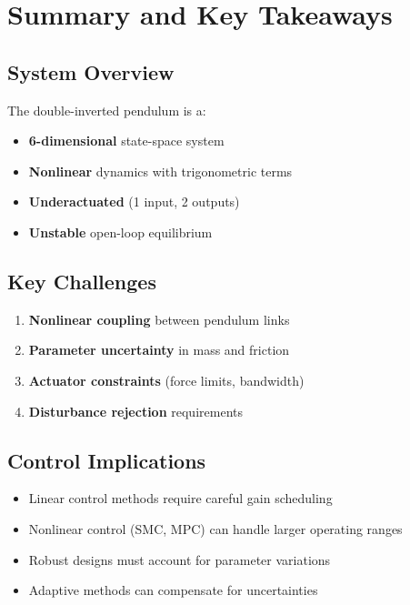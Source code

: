 \documentclass[11pt,a4paper]{article}
\begin{document}
\section{Summary and Key Takeaways}

\subsection{System Overview}

The double-inverted pendulum is a:
\begin{itemize}
    \item \textbf{6-dimensional} state-space system
    \item \textbf{Nonlinear} dynamics with trigonometric terms
    \item \textbf{Underactuated} (1 input, 2 outputs)
    \item \textbf{Unstable} open-loop equilibrium
\end{itemize}

\subsection{Key Challenges}

\begin{enumerate}
    \item \textbf{Nonlinear coupling} between pendulum links
    \item \textbf{Parameter uncertainty} in mass and friction
    \item \textbf{Actuator constraints} (force limits, bandwidth)
    \item \textbf{Disturbance rejection} requirements
\end{enumerate}

\subsection{Control Implications}

\begin{itemize}
    \item Linear control methods require careful gain scheduling
    \item Nonlinear control (SMC, MPC) can handle larger operating ranges
    \item Robust designs must account for parameter variations
    \item Adaptive methods can compensate for uncertainties
\end{itemize}
\end{document}

